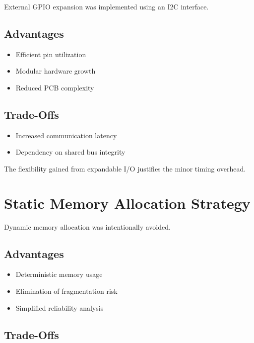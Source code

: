 External GPIO expansion was implemented using an I2C interface.

\subsection{Advantages}

\begin{itemize}
	\item Efficient pin utilization
	\item Modular hardware growth
	\item Reduced PCB complexity
\end{itemize}

\subsection{Trade-Offs}

\begin{itemize}
	\item Increased communication latency
	\item Dependency on shared bus integrity
\end{itemize}

The flexibility gained from expandable I/O justifies the minor timing overhead.


\section{Static Memory Allocation Strategy}

Dynamic memory allocation was intentionally avoided.

\subsection{Advantages}

\begin{itemize}
	\item Deterministic memory usage
	\item Elimination of fragmentation risk
	\item Simplified reliability analysis
\end{itemize}

\subsection{Trade-Offs}

